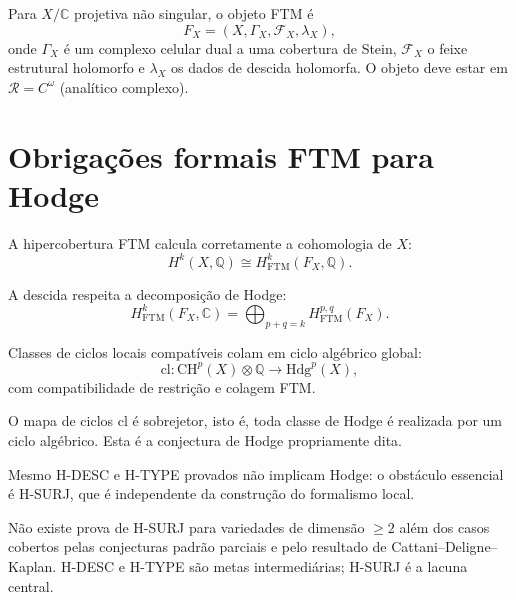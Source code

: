 \documentclass[11pt,a4paper]{article}
\begin{document}
\begin{definition}
Para $X/\mathbb C$ projetiva não singular, o objeto FTM é
\[
  F_X=(X,\Gamma_X,\mathcal F_X,\lambda_X),
\]
onde $\Gamma_X$ é um complexo celular dual a uma cobertura de Stein,
$\mathcal F_X$ o feixe estrutural holomorfo e $\lambda_X$ os dados
de descida holomorfa. O objeto deve estar em $\mathcal R=C^\omega$
(analítico complexo).
\end{definition}

\section{Obrigações formais FTM para Hodge}

\begin{obligation}[H-DESC]\label{ob:HDESC}
A hipercobertura FTM calcula corretamente a cohomologia de $X$:
\[
  H^k(X,\mathbb Q)\cong H^k_{\mathrm{FTM}}(F_X,\mathbb Q).
\]
\end{obligation}

\begin{obligation}[H-TYPE]\label{ob:HTYPE}
A descida respeita a decomposição de Hodge:
\[
  H^k_{\mathrm{FTM}}(F_X,\mathbb C)
  =\bigoplus_{p+q=k}H^{p,q}_{\mathrm{FTM}}(F_X).
\]
\end{obligation}

\begin{obligation}[H-CYCLE]\label{ob:HCYCLE}
Classes de ciclos locais compatíveis colam em ciclo algébrico global:
\[
  \mathrm{cl}:\mathrm{CH}^p(X)\otimes\mathbb Q
  \longrightarrow \mathrm{Hdg}^p(X),
\]
com compatibilidade de restrição e colagem FTM.
\end{obligation}

\begin{obligation}[H-SURJ]\label{ob:HSURJ}
O mapa de ciclos $\mathrm{cl}$ é sobrejetor,
isto é, toda classe de Hodge é realizada por um ciclo algébrico.
Esta é a conjectura de Hodge propriamente dita.
\end{obligation}

\begin{remark}
Mesmo H-DESC e H-TYPE provados não implicam Hodge:
o obstáculo essencial é H-SURJ, que é independente
da construção do formalismo local.
\end{remark}

\begin{gap}
Não existe prova de H-SURJ para variedades de dimensão $\ge2$
além dos casos cobertos pelas conjecturas padrão parciais
e pelo resultado de Cattani–Deligne–Kaplan.
H-DESC e H-TYPE são metas intermediárias; H-SURJ é a lacuna central. \OPEN
\end{gap}

\end{document}
